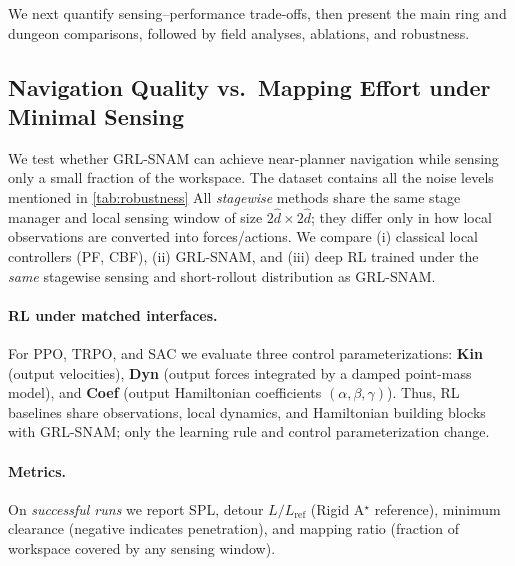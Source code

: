 \documentclass{article} %
\begin{document}
We next quantify sensing--performance trade-offs, then present the main ring and dungeon comparisons, followed by field analyses, ablations, and robustness.

\subsection{Navigation Quality vs.\ Mapping Effort under Minimal Sensing}
\label{subsec:minimal_sensing}

We test whether GRL-SNAM can achieve near-planner navigation while sensing only a small fraction of the workspace. {The dataset contains all the noise levels mentioned in \cref{tab:robustness}}
All \emph{stagewise} methods share the same stage manager and local sensing window of size $2\hat d \times 2\hat d$; they differ only in how local observations are converted into forces/actions. We compare (i) classical local controllers (PF, CBF), (ii) GRL-SNAM, and (iii) deep RL trained under the \emph{same} stagewise sensing and short-rollout distribution as GRL-SNAM.

\paragraph{RL under matched interfaces.}
For PPO, TRPO, and SAC we evaluate three control parameterizations:
\textbf{Kin} (output velocities), \textbf{Dyn} (output forces integrated by a damped point-mass model), and \textbf{Coef} (output Hamiltonian coefficients $(\alpha,\beta,\gamma)$). 
Thus, RL baselines share observations, local dynamics, and Hamiltonian building blocks with GRL-SNAM; only the learning rule and control parameterization change.

\paragraph{Metrics.}
On \emph{successful runs} we report SPL, detour $L/L_{\mathrm{ref}}$ (Rigid A$^{\star}$ reference), minimum clearance (negative indicates penetration), and mapping ratio (fraction of workspace covered by any sensing window).
\end{document}
